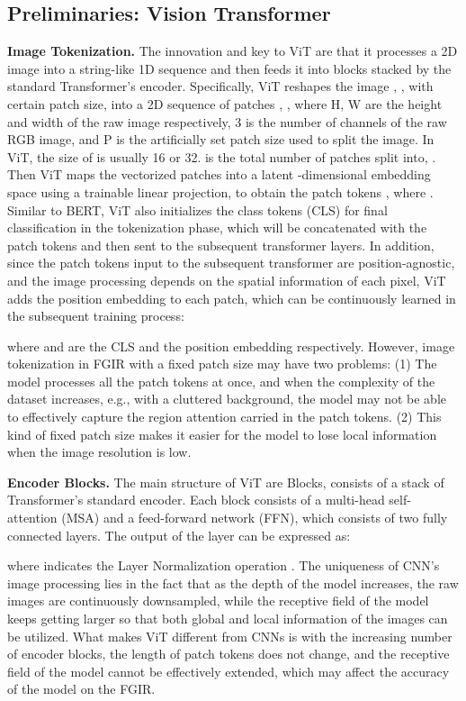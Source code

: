 \documentclass[sigconf]{acmart}
\begin{document}
\subsection{Preliminaries: Vision Transformer}
\textbf{Image Tokenization.} The innovation and key to ViT are that it processes a 2D image into a string-like 1D sequence and then feeds it into blocks stacked by the standard Transformer's encoder. Specifically, ViT reshapes the image , , with certain patch size, into a 2D sequence of patches ,  , where H, W are the height and width of the raw image respectively, 3 is the number of channels of the raw RGB image, and P is the artificially set patch size used to split the image. In ViT, the size of  is usually 16 or 32.  is the total number of patches split into, . Then ViT maps the vectorized patches  into a latent -dimensional embedding space using a trainable linear projection, to obtain the patch tokens , where . Similar to BERT, ViT also initializes the class tokens (CLS) for final classification in the tokenization phase, which will be concatenated with the patch tokens and then sent to the subsequent transformer layers. In addition, since the patch tokens input to the subsequent transformer are position-agnostic, and the image processing depends on the spatial information of each pixel, ViT adds the position embedding to each patch, which can be continuously learned in the subsequent training process:

where  and  are the CLS and the position embedding respectively.
However, image tokenization in FGIR with a fixed patch size may have two problems: (1) The model processes all the patch tokens at once, and when the complexity of the dataset increases, e.g., with a cluttered background, the model may not be able to effectively capture the region attention carried in the patch tokens. (2) This kind of fixed patch size makes it easier for the model to lose local information when the image resolution is low.

\textbf{Encoder Blocks.} The main structure of ViT are Blocks, consists of a stack of  Transformer's standard encoder. Each block consists of a multi-head self-attention (MSA) and a feed-forward network (FFN), which consists of two fully connected layers. The output of the  layer can be expressed as:


where  indicates the Layer Normalization operation \cite{LN}. The uniqueness of CNN's image processing lies in the fact that as the depth of the model increases, the raw images are continuously downsampled, while the receptive field of the model keeps getting larger so that both global and local information of the images can be utilized. What makes ViT different from CNNs is with the increasing number of encoder blocks, the length of patch tokens does not change, and the receptive field of the model cannot be effectively extended, which may affect the accuracy of the model on the FGIR.
\end{document}
